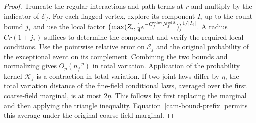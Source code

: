 \documentclass[11pt,a4paper]{article}
\numberwithin{equation}{section}
\begin{document}
\begin{proof}
Truncate the regular interactions and path terms at \(r\) and multiply by the indicator of \(\mathcal E_f\). For each flagged vertex, explore its component \(I_i\) up to the count bound \(j_*\) and use the local factor
\(\bigl(\max(Z_i,\tfrac14 e^{-C_f^{\rm edge}N_f^{\rm edit}})\bigr)^{1/|I_i|}\).
A radius \(Cr(1+j_*)\) suffices to determine the component and verify the required local conditions. Use the pointwise relative error on \(\mathcal E_f\) and the original probability of the exceptional event on its complement. Combining the two bounds and normalizing gives \(O_p(n_f^{-p})\) in total variation. Application of the probability kernel \(\mathcal K_f\) is a contraction in total variation. If two joint laws differ by \(\eta\), the total variation distance of the fine-field conditional laws, averaged over the first coarse-field marginal, is at most \(2\eta\). This follows by first replacing the marginal and then applying the triangle inequality. Equation~\eqref{cam-bound-prefix} permits this average under the original coarse-field marginal.
\end{proof}
\end{document}
